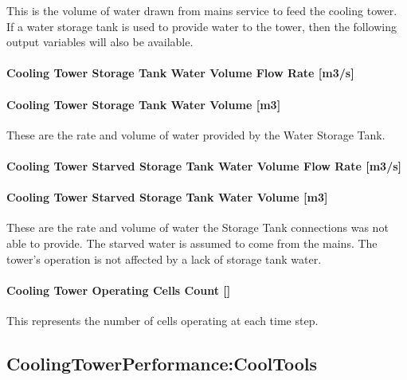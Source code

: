 This is the volume of water drawn from mains service to feed the cooling tower.~ If a water storage tank is used to provide water to the tower, then the following output variables will also be available.

\paragraph{Cooling Tower Storage Tank Water Volume Flow Rate {[}m3/s{]}}\label{cooling-tower-storage-tank-water-volume-flow-rate-m3s-3}

\paragraph{Cooling Tower Storage Tank Water Volume {[}m3{]}}\label{cooling-tower-storage-tank-water-volume-m3-3}

These are the rate and volume of water provided by the Water Storage Tank.

\paragraph{Cooling Tower Starved Storage Tank Water Volume Flow Rate {[}m3/s{]}}\label{cooling-tower-starved-storage-tank-water-volume-flow-rate-m3s-3}

\paragraph{Cooling Tower Starved Storage Tank Water Volume {[}m3{]}}\label{cooling-tower-starved-storage-tank-water-volume-m3-3}

These are the rate and volume of water the Storage Tank connections was not able to provide. The starved water is assumed to come from the mains. The tower's operation is not affected by a lack of storage tank water.

\paragraph{Cooling Tower Operating Cells Count {[]}}\label{cooling-tower-operating-cells-count-3}

This represents the number of cells operating at each time step.

\subsection{CoolingTowerPerformance:CoolTools}\label{coolingtowerperformancecooltools}

